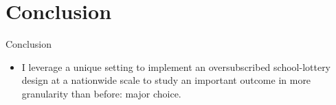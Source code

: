\documentclass[notes,11pt, aspectratio=169]{beamer}
\newenvironment{wideitemize}{%
  \begin{minipage}{0.90\textwidth}
  \begin{itemize}
  \addtolength{\itemsep}{1em}
}{%
  \end{itemize}
  \end{minipage}
}
\begin{document}
\section{Conclusion}

\begin{frame}{Conclusion}

\begin{wideitemize}


\item I leverage a unique setting to implement an oversubscribed school-lottery design at a nationwide scale to study an important outcome in more granularity than before: major choice. 




\end{wideitemize}
\end{frame}

\end{document}
